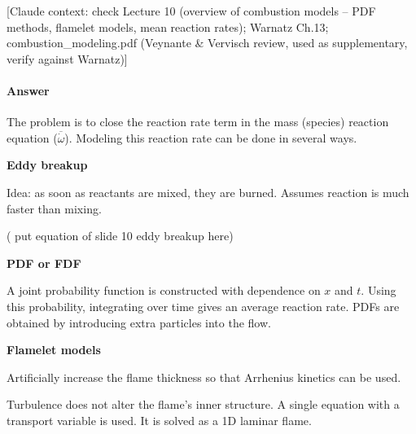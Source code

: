 \label{Q:3aproax}

{\color{gray}\footnotesize [Claude context: check Lecture 10 (overview of combustion models -- PDF methods, flamelet models, mean reaction rates); Warnatz Ch.13; combustion\_modeling.pdf (Veynante \& Vervisch review, used as supplementary, verify against Warnatz)]}



\paragraph{Answer}

The problem is to close the reaction rate term in the mass (species) reaction equation ($\overline{\dot{\omega}}$). Modeling this reaction rate can be done in several ways.

\textbf{Eddy breakup}

Idea: as soon as reactants are mixed, they are burned. Assumes reaction is much faster than mixing.

( put equation of slide 10 eddy breakup here)

\textbf{PDF or FDF}

A joint probability function is constructed with dependence on $x$ and $t$. Using this probability, integrating over time gives an average reaction rate. PDFs are obtained by introducing extra particles into the flow.





\textbf{Flamelet models}

Artificially increase the flame thickness so that Arrhenius kinetics can be used.

Turbulence does not alter the flame's inner structure. A single equation with a transport variable is used.
It is solved as a 1D laminar flame.





